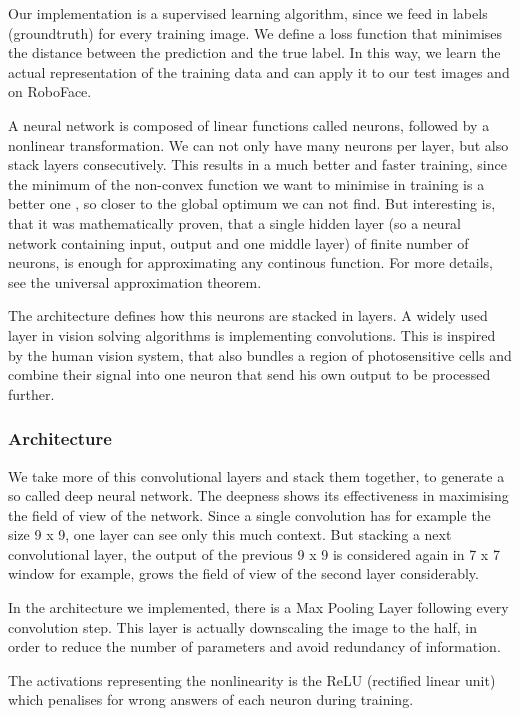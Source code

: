 \documentclass[12.5pt]{scrartcl}
\begin{document}
	Our implementation is a supervised learning algorithm, since we feed in labels (groundtruth) for every training image. We define a loss function that minimises the distance between the prediction and the true label. In this way, we learn the actual representation of the training data and can apply it to our test images and on RoboFace.
	
	A neural network is composed of linear functions called neurons, followed by a nonlinear transformation. We can not only have many neurons per layer, but also stack layers consecutively. This results in a much better and faster training, since the minimum of the non-convex function we want to minimise in training is a better one , so closer to the global optimum we can not find. But interesting is, that it was mathematically proven, that a single hidden layer (so a neural network containing input, output and one middle layer) of finite number of neurons, is enough for approximating any continous function. For more details, see the universal approximation theorem.
	
	
	The architecture defines how this neurons are stacked in layers. A widely used layer in vision solving algorithms is implementing convolutions. This is inspired by the human vision system, that also bundles a region of photosensitive cells and combine their signal into one neuron that send his own output to be processed further.
	
	\subsubsection{Architecture}
	We take more of this convolutional layers and stack them together, to generate a so called deep neural network. The deepness shows its effectiveness in maximising the field of view of the network. Since a single convolution has for example the size 9 x 9, one layer can see only this much context. But stacking a next convolutional layer, the output of the previous 9 x 9 is considered again in 7 x 7 window for example, grows the field of view of the second layer considerably.
	
	In the architecture we implemented, there is a Max Pooling Layer following every convolution step. This layer is actually downscaling the image to the half, in order to reduce the number of parameters and avoid redundancy of information.
	
	The activations representing the nonlinearity is the ReLU (rectified linear unit) which penalises for wrong answers of each neuron during training.
	
\end{document}
